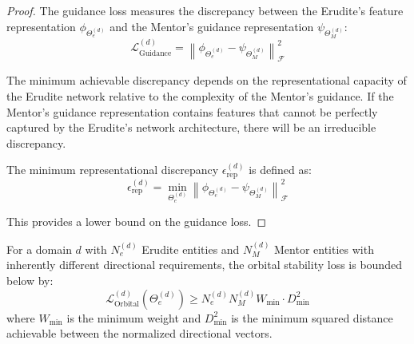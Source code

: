 \begin{proof}
The guidance loss measures the discrepancy between the Erudite's feature representation $\phi_{\Theta_e^{(d)}}$ and the Mentor's guidance representation $\psi_{\Theta_M^{(d)}}$:
\begin{equation}
\mathcal{L}_{\text{Guidance}}^{(d)} = \left\|\phi_{\Theta_e^{(d)}} - \psi_{\Theta_M^{(d)}}\right\|^2_{\mathcal{F}}
\end{equation}

The minimum achievable discrepancy depends on the representational capacity of the Erudite network relative to the complexity of the Mentor's guidance. If the Mentor's guidance representation contains features that cannot be perfectly captured by the Erudite's network architecture, there will be an irreducible discrepancy.

The minimum representational discrepancy $\epsilon_{\text{rep}}^{(d)}$ is defined as:
\begin{equation}
\epsilon_{\text{rep}}^{(d)} = \min_{\Theta_e^{(d)}} \left\|\phi_{\Theta_e^{(d)}} - \psi_{\Theta_M^{(d)}}\right\|^2_{\mathcal{F}}
\end{equation}

This provides a lower bound on the guidance loss.
\end{proof}

\begin{theorem}
For a domain $d$ with $N_e^{(d)}$ Erudite entities and $N_M^{(d)}$ Mentor entities with inherently different directional requirements, the orbital stability loss is bounded below by:
\begin{equation}
\mathcal{L}_{\text{Orbital}}^{(d)}(\Theta_e^{(d)}) \geq N_e^{(d)}N_M^{(d)}W_{\text{min}} \cdot D_{\text{min}}^2
\end{equation}
where $W_{\text{min}}$ is the minimum weight and $D_{\text{min}}^2$ is the minimum squared distance achievable between the normalized directional vectors.
\end{theorem}

